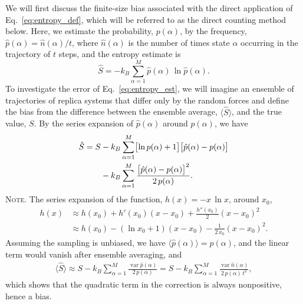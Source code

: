 \documentclass[reprint, superscriptaddress]{revtex4-1}
\newcommand{\note}[1]{{\color{DarkGreen}\footnotesize \textsc{Note.} #1}}
\begin{document}
We will first discuss the finite-size bias associated with
the direct application of Eq.~\eqref{eq:entropy_def},
which will be referred to as the direct counting method below.
%
Here, we estimate the probability, $p(\alpha)$,
by the frequency, $\hat{p}(\alpha) = \hat{n}(\alpha) / t$,
where $\hat{n}(\alpha)$ is the number of times state $\alpha$ occurring in the trajectory of $t$ steps,
and the entropy estimate is
%
\begin{equation}
  \hat S
  =
  -k_B \sum_{\alpha = 1}^M \hat{p}(\alpha) \, \ln \hat{p}(\alpha)
  .
  \label{eq:entropy_est}
\end{equation}
%
To investigate the error of Eq.~\eqref{eq:entropy_est},
we will imagine an ensemble of trajectories of replica systems
that differ only by the random forces
and define the bias from the difference
between the ensemble average,
$\bigl\langle \hat S \bigr\rangle$,
and the true value, $S$.
%
By the series expansion of $\hat{p}(\alpha)$ around $p(\alpha)$, we have
%
\begin{align}
  \hat S
  =
  S
  &- k_B \sum_{\alpha = 1}^M
    \bigl[\ln p(\alpha) + 1 \bigr]
    \bigl[ \hat{p}(\alpha) - p(\alpha) \bigr]
  \notag\\
  &- k_B \sum_{\alpha = 1}^M
    \frac{ \bigl[ \hat{p}(\alpha) - p(\alpha) \bigr]^2 } { 2 \, p(\alpha) }
  .
  \label{eq:Shat_series}
\end{align}
%
\note{The series expansion of the function, $h(x) = -x \, \ln x$,
around $x_0$,
%
\begin{align*}
  h(x)
  &\approx h(x_0) + h'(x_0) (x - x_0) + \frac{h''(x_0)}{2} (x - x_0)^2 \\
  &\approx h(x_0) - (\ln x_0 + 1) ( x - x_0) - \frac{1}{2 \, x_0} (x - x_0)^2
  .
\end{align*}
}
%
Assuming the sampling is unbiased,
we have $\langle \hat{p}(\alpha) \rangle = p(\alpha)$,
and the linear term would vanish
after ensemble averaging, and
%
\begin{align}
  \bigl\langle \hat S \bigr\rangle
  \approx
  S - k_B \sum_{\alpha = 1}^M
    \frac{ \operatorname{var} \hat{p}(\alpha) } { 2 \, p(\alpha) }
  =
  S - k_B \sum_{\alpha = 1}^M
    \frac{ \operatorname{var} \hat{n}(\alpha) } { 2 \, p(\alpha) \, t^2 }
  ,
  \label{eq:entest_2nd}
\end{align}
%
which shows that the quadratic term in the correction
is always nonpositive, hence a bias.
\end{document}
